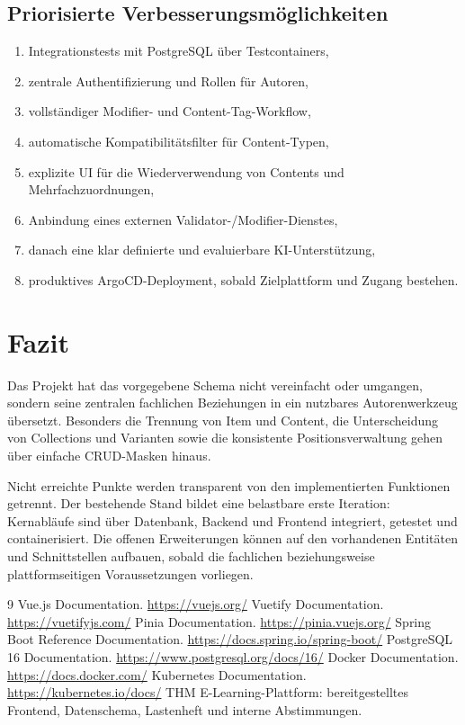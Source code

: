 \documentclass[11pt,a4paper]{article}
\begin{document}
\subsection{Priorisierte Verbesserungsmöglichkeiten}
\begin{enumerate}
\item Integrationstests mit PostgreSQL über Testcontainers,
\item zentrale Authentifizierung und Rollen für Autoren,
\item vollständiger Modifier- und Content-Tag-Workflow,
\item automatische Kompatibilitätsfilter für Content-Typen,
\item explizite UI für die Wiederverwendung von Contents und
Mehrfachzuordnungen,
\item Anbindung eines externen Validator-/Modifier-Dienstes,
\item danach eine klar definierte und evaluierbare KI-Unterstützung,
\item produktives ArgoCD-Deployment, sobald Zielplattform und Zugang bestehen.
\end{enumerate}

\section{Fazit}
Das Projekt hat das vorgegebene Schema nicht vereinfacht oder umgangen,
sondern seine zentralen fachlichen Beziehungen in ein nutzbares
Autorenwerkzeug übersetzt. Besonders die Trennung von Item und Content, die
Unterscheidung von Collections und Varianten sowie die konsistente
Positionsverwaltung gehen über einfache CRUD-Masken hinaus.

Nicht erreichte Punkte werden transparent von den implementierten Funktionen
getrennt. Der bestehende Stand bildet eine belastbare erste Iteration:
Kernabläufe sind über Datenbank, Backend und Frontend integriert, getestet und
containerisiert. Die offenen Erweiterungen können auf den vorhandenen
Entitäten und Schnittstellen aufbauen, sobald die fachlichen beziehungsweise
plattformseitigen Voraussetzungen vorliegen.

\begin{thebibliography}{9}
 Vue.js Documentation. \url{https://vuejs.org/}
 Vuetify Documentation. \url{https://vuetifyjs.com/}
 Pinia Documentation. \url{https://pinia.vuejs.org/}
 Spring Boot Reference Documentation.
\url{https://docs.spring.io/spring-boot/}
 PostgreSQL 16 Documentation.
\url{https://www.postgresql.org/docs/16/}
 Docker Documentation. \url{https://docs.docker.com/}
 Kubernetes Documentation. \url{https://kubernetes.io/docs/}
 THM E-Learning-Plattform: bereitgestelltes Frontend,
Datenschema, Lastenheft und interne Abstimmungen.
\end{thebibliography}
\end{document}
